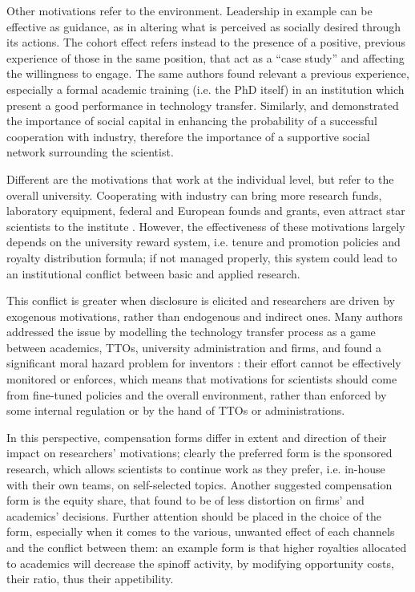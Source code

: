 Other motivations refer to the environment. Leadership in example can be effective as guidance, as in altering what is perceived as socially desired through its actions. The cohort effect \citep{Bercovitz2006} refers instead to the presence of a positive, previous experience of those in the same position, that act as a \enquote{case study} and affecting the willingness to engage. The same authors found relevant a previous experience, especially a formal academic training (i.e. the PhD itself) in an institution which present a good performance in technology transfer. Similarly, \citet{Murray2004} and \citet{Link2007} demonstrated the importance of social capital in enhancing the probability of a successful cooperation with industry, therefore the importance of a supportive social network surrounding the scientist.

Different are the motivations that work at the individual level, but refer to the overall university. Cooperating with industry can bring more research funds, laboratory equipment, federal and European founds and grants, even attract star scientists to the institute \citep{OShea2004, Baldini2007, DEste2007}. However, the effectiveness of these motivations largely depends on the university reward system, i.e. tenure and promotion policies and royalty distribution formula; if not managed properly, this system could lead to an institutional conflict between basic and applied research. 

This conflict is greater when disclosure is elicited and researchers are driven by exogenous motivations, rather than endogenous and indirect ones. Many authors addressed the issue by modelling the technology transfer process as a game between academics, TTOs, university administration and firms, and found a significant moral hazard problem for inventors \citep{Jensen1998}: their effort cannot be effectively monitored or enforces, which means that motivations for scientists should come from fine-tuned policies and the overall environment, rather than enforced by some internal regulation or by the hand of TTOs or administrations. 

In this perspective, compensation forms differ in extent and direction of their impact on researchers' motivations; clearly the preferred form is the sponsored research, which allows scientists to continue work as they prefer, i.e. in-house with their own teams, on self-selected topics. Another suggested compensation form is the equity share, that \citet{Jensen1998} found to be of less distortion on firms' and academics' decisions. Further attention should be placed in the choice of the form, especially when it comes to the various, unwanted effect of each channels and the conflict between them: an example form \citet{OShea2004} is that higher royalties allocated to academics will decrease the spinoff activity, by modifying opportunity costs, their ratio, thus their appetibility.

